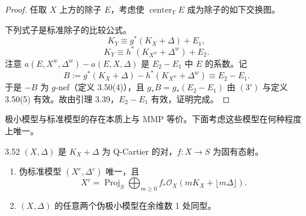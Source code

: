 \begin{proof}
任取 $X$ 上方的除子 $E$，考虑使 $\operatorname{center}_Y E$ 成为除子的如下交换图。
\begin{center}
\end{center}
下列式子是标准除子的比较公式。
\[
K_Y \equiv g^*(K_X+\Delta)+E_1,
\]
\[
K_Y \equiv h^*(K_{X^{w}}+\Delta^{w})+E_2.
\]
注意 $a(E,X^{w},\Delta^{w})-a(E,X,\Delta)$ 是 $E_2-E_1$ 中 $E$ 的系数。记
\[
B:=g^*(K_X+\Delta)-h^*(K_{X^{w}}+\Delta^{w})\equiv E_2-E_1.
\]
于是 $-B$ 为 $g$-nef（定义 3.50(4)），且 $g_*B=g_*(E_2-E_1)$ 由 $(3')$ 与定义 3.50(5) 有效。故由引理 3.39，$E_2-E_1$ 有效，证明完成。
\end{proof}

极小模型与标准模型的存在本质上与 MMP 等价。下面考虑这些模型在何种程度上唯一。

\begin{theoremp}{3.52}
$(X,\Delta)$ 是 $K_X+\Delta$ 为 Q-Cartier 的对，$f:X\to S$ 为固有态射。
\begin{enumerate}[label=(\arabic*)]
\item 伪标准模型 $(X^{c},\Delta^{c})$ 唯一，且
\[
X^{c}=\operatorname{Proj}_S \bigoplus_{m\ge0} f_*\mathcal{O}_X(mK_X+\lfloor m\Delta\rfloor).
\]
\item $(X,\Delta)$ 的任意两个伪极小模型在余维数 1 处同型。
\end{enumerate}
\end{theoremp}

